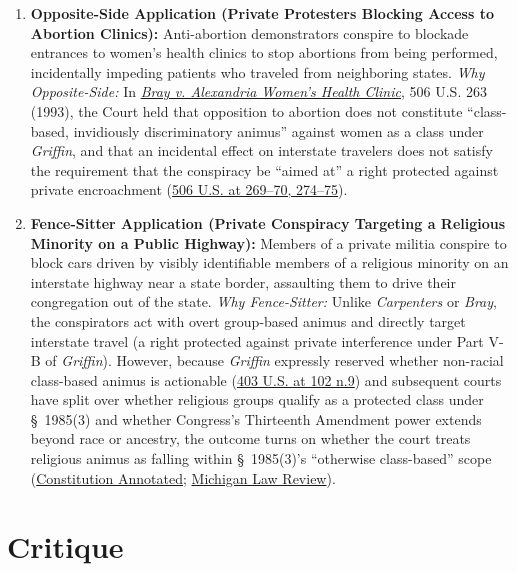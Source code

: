 \documentclass[12pt]{article}
\begin{document}
\begin{enumerate}
\item \textbf{Opposite-Side Application (Private Protesters Blocking Access to Abortion Clinics):} Anti-abortion demonstrators conspire to blockade entrances to women's health clinics to stop abortions from being performed, incidentally impeding patients who traveled from neighboring states. \textit{Why Opposite-Side:} In \href{https://supreme.justia.com/cases/federal/us/506/263/}{\textit{Bray v. Alexandria Women's Health Clinic}}, 506 U.S. 263 (1993), the Court held that opposition to abortion does not constitute ``class-based, invidiously discriminatory animus'' against women as a class under \textit{Griffin}, and that an incidental effect on interstate travelers does not satisfy the requirement that the conspiracy be ``aimed at'' a right protected against private encroachment (\href{https://supreme.justia.com/cases/federal/us/506/263/}{506 U.S. at 269--70, 274--75}).

\item \textbf{Fence-Sitter Application (Private Conspiracy Targeting a Religious Minority on a Public Highway):} Members of a private militia conspire to block cars driven by visibly identifiable members of a religious minority on an interstate highway near a state border, assaulting them to drive their congregation out of the state. \textit{Why Fence-Sitter:} Unlike \textit{Carpenters} or \textit{Bray}, the conspirators act with overt group-based animus and directly target interstate travel (a right protected against private interference under Part V-B of \textit{Griffin}). However, because \textit{Griffin} expressly reserved whether non-racial class-based animus is actionable (\href{https://supreme.justia.com/cases/federal/us/403/88/}{403 U.S. at 102 n.9}) and subsequent courts have split over whether religious groups qualify as a protected class under \S~1985(3) and whether Congress's Thirteenth Amendment power extends beyond race or ancestry, the outcome turns on whether the court treats religious animus as falling within \S~1985(3)'s ``otherwise class-based'' scope (\href{https://constitution.congress.gov/browse/essay/amdt14-S5-2/ALDE_00000851/}{Constitution Annotated}; \href{https://repository.law.umich.edu/cgi/viewcontent.cgi?article=2822&context=mlr}{Michigan Law Review}).
\end{enumerate}

\section{Critique}
\end{document}
